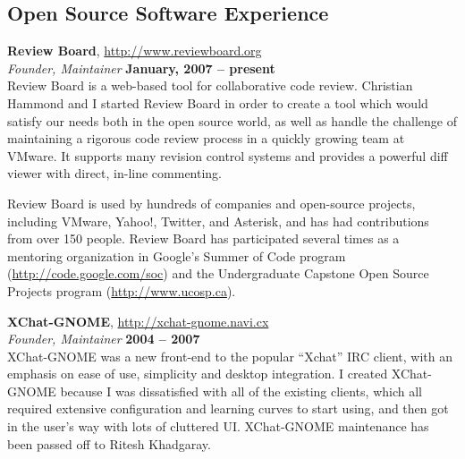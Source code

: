 \documentclass[margin,line]{resume}
\begin{document}
\begin{resume}
    \ifcv
    \else
        \newpage
    \fi

    \section{\mysidestyle Open Source Software Experience}

    {\bf Review Board}, \url{http://www.reviewboard.org} \vspace{2mm}\\\vspace{1mm}%
    {\sl Founder, Maintainer} \hfill {\bf January, 2007 -- present}\\
    Review Board is a web-based tool for collaborative code review. Christian
    Hammond and I started Review Board in order to create a tool which would
    satisfy our needs both in the open source world, as well as handle the
    challenge of maintaining a rigorous code review process in a quickly growing
    team at VMware. It supports many revision control systems and provides a
    powerful diff viewer with direct, in-line commenting.

    Review Board is used by hundreds of companies and open-source projects,
    including VMware, Yahoo!, Twitter, and Asterisk, and has had contributions
    from over 150 people. Review Board has participated several times as a
    mentoring organization in Google's Summer of Code program
    (\url{http://code.google.com/soc}) and the Undergraduate Capstone Open
    Source Projects program (\url{http://www.ucosp.ca}).

    \ifcv
        \newpage
    \fi

    {\bf XChat-GNOME}, \url{http://xchat-gnome.navi.cx} \vspace{2mm}\\\vspace{1mm}%
    {\sl Founder, Maintainer} \hfill {\bf 2004 -- 2007}\\
    XChat-GNOME was a new front-end to the popular ``Xchat'' IRC client, with an
    emphasis on ease of use, simplicity and desktop integration.  I created
    XChat-GNOME because I was dissatisfied with all of the existing clients,
    which all required extensive configuration and learning curves to start
    using, and then got in the user's way with lots of cluttered UI.
    XChat-GNOME maintenance has been passed off to Ritesh Khadgaray.


\end{resume}
\end{document}
